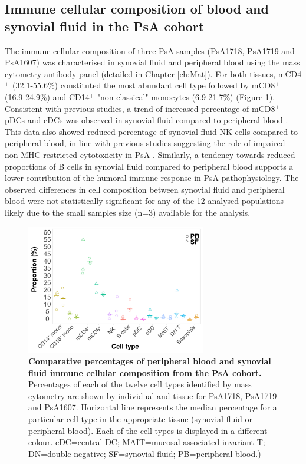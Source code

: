\subsection{Immune cellular composition of blood and synovial fluid in the PsA cohort}
The immune cellular composition of three PsA samples (PsA1718, PsA1719 and PsA1607) was characterised in synovial fluid and peripheral blood using the mass cytometry antibody panel (detailed in Chapter \ref{ch:Mat}). For both tissues, mCD4$^+$ (32.1-55.6\%) constituted the most abundant cell type followed by mCD8$^+$ (16.9-24.9\%) and CD14$^+$ "non-classical" monocytes (6.9-21.7\%) (Figure \ref{figure:PsA_cell_composition}). Consistent with previous studies, a trend of increased percentage of mCD8$^+$ pDCs and cDCs was observed in synovial fluid compared to peripheral blood \parencite{Ross2000,Jongbloed2006}. This data also showed reduced percentage of synovial fluid NK cells compared to peripheral blood, in line with previous studies suggesting the role of impaired non-MHC-restricted cytotoxicity in PsA \parencite{Spadaro2004}. Similarly, a tendency towards reduced proportions of B cells in synovial fluid compared to peripheral blood supports a lower contribution of the humoral immune response in PsA pathophysiology. The observed differences in cell composition between synovial fluid and peripheral blood were not statistically significant for any of the 12 analysed populations likely due to the small samples size (n=3) available for the analysis. 

\begin{figure}[H]
\centering
\includegraphics[width=0.7\textwidth]{./Results3/pdfs/PSA_ATAC_cohort_cell_type_composition_boxplots}
\caption[Comparative percentages of peripheral blood and synovial fluid immune cellular composition from the PsA cohort.]{\textbf{Comparative percentages of peripheral blood and synovial fluid immune cellular composition from the PsA cohort.} Percentages of each of the twelve cell types identified by mass cytometry are shown by individual and tissue for PsA1718, PsA1719 and PsA1607. Horizontal line represents the median percentage for a particular cell type in the appropriate tissue (synovial fluid or peripheral blood). Each of the cell types is displayed in a different colour. cDC=central DC; MAIT=mucosal-associated invariant T; DN=double negative; SF=synovial fluid; PB=peripheral blood.)}
\label{figure:PsA_cell_composition}
\end{figure}



